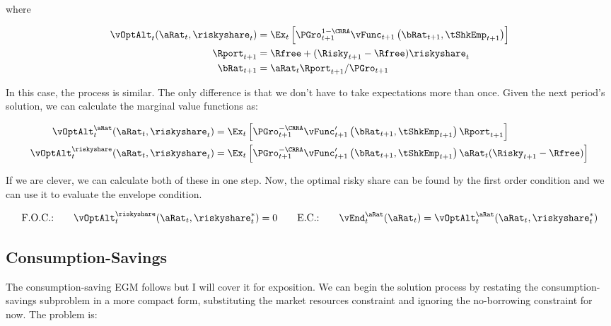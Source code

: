 \documentclass[\econtexRoot/SequentialEGM]{subfiles}
\begin{document}
where

\begin{equation}
    \begin{split}
        \vOptAlt_{t}(\aRat_{t}, \riskyshare_{t}) & =  \Ex_{t} \left[ \PGro_{t+1}^{1-\CRRA} \vFunc_{t+1}\left(\bRat_{t+1}, \tShkEmp_{t+1}\right)   \right] \\
        \Rport_{t+1} & = \Rfree + (\Risky_{t+1} - \Rfree) \riskyshare_{t} \\
        \bRat_{t+1} & = \aRat_{t} \Rport_{t+1} / \PGro_{t+1}
    \end{split}
\end{equation}

In this case, the process is similar. The only difference is that we don't have to take expectations more than once. Given the next period's solution, we can calculate the marginal value functions as:

\begin{equation}
    \begin{split}
        \vOptAlt_{t}^{\aRat}(\aRat_{t}, \riskyshare_{t}) & =  \Ex_{t} \left[ \PGro_{t+1}^{-\CRRA} \vFunc_{t+1}'\left(\bRat_{t+1}, \tShkEmp_{t+1}\right) \Rport_{t+1}   \right] \\
        \vOptAlt_{t}^{\riskyshare}(\aRat_{t}, \riskyshare_{t}) & =  \Ex_{t} \left[ \PGro_{t+1}^{-\CRRA} \vFunc_{t+1}'\left(\bRat_{t+1}, \tShkEmp_{t+1}\right) \aRat_{t} (\Risky_{t+1} - \Rfree)   \right] \\
    \end{split}
\end{equation}

If we are clever, we can calculate both of these in one step. Now, the optimal risky share can be found by the first order condition and we can use it to evaluate the envelope condition.

\begin{equation}
    \text{F.O.C.:} \qquad \vOptAlt_{t}^{\riskyshare}(\aRat_{t}, \riskyshare_{t}^{*})  = 0 \qquad
    \text{E.C.:} \qquad \vEnd_{t}^{\aRat}(\aRat_{t}) = \vOptAlt_{t}^{\aRat}(\aRat_{t}, \riskyshare_{t}^{*})
\end{equation}



\subsection{Consumption-Savings}

The consumption-saving EGM follows \cite{Carroll2006-wq} but I will cover it for exposition. We can begin the solution process by restating the consumption-savings subproblem in a more compact form, substituting the market resources constraint and ignoring the no-borrowing constraint for now. The problem is:
\end{document}
